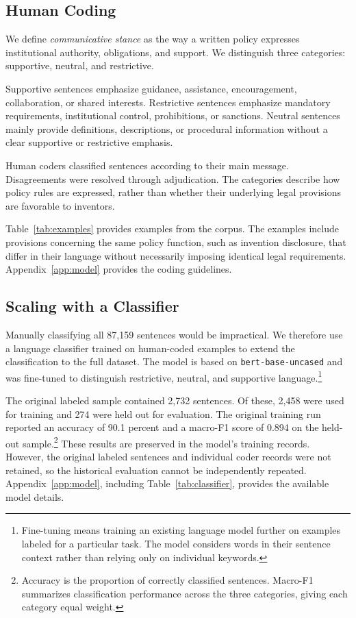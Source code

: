 \documentclass[11pt]{article}
\begin{document}


\subsection{Human Coding}

We define \emph{communicative stance} as the way a written policy expresses institutional authority, obligations, and support. We distinguish three categories: supportive, neutral, and restrictive.

Supportive sentences emphasize guidance, assistance, encouragement, collaboration, or shared interests. Restrictive sentences emphasize mandatory requirements, institutional control, prohibitions, or sanctions. Neutral sentences mainly provide definitions, descriptions, or procedural information without a clear supportive or restrictive emphasis.

Human coders classified sentences according to their main message. Disagreements were resolved through adjudication. The categories describe how policy rules are expressed, rather than whether their underlying legal provisions are favorable to inventors.

Table~\ref{tab:examples} provides examples from the corpus. The examples include provisions concerning the same policy function, such as invention disclosure, that differ in their language without necessarily imposing identical legal requirements. Appendix~\ref{app:model} provides the coding guidelines.



\subsection{Scaling with a Classifier}

Manually classifying all 87,159 sentences would be impractical. We therefore use a language classifier trained on human-coded examples to extend the classification to the full dataset. The model is based on \texttt{bert-base-uncased} \citep{devlin2019bert} and was fine-tuned to distinguish restrictive, neutral, and supportive language.\footnote{Fine-tuning means training an existing language model further on examples labeled for a particular task. The model considers words in their sentence context rather than relying only on individual keywords.}

The original labeled sample contained 2,732 sentences. Of these, 2,458 were used for training and 274 were held out for evaluation. The original training run reported an accuracy of 90.1 percent and a macro-F1 score of 0.894 on the held-out sample.\footnote{Accuracy is the proportion of correctly classified sentences. Macro-F1 summarizes classification performance across the three categories, giving each category equal weight.} These results are preserved in the model's training records. However, the original labeled sentences and individual coder records were not retained, so the historical evaluation cannot be independently repeated. Appendix~\ref{app:model}, including Table~\ref{tab:classifier}, provides the available model details.
\end{document}
